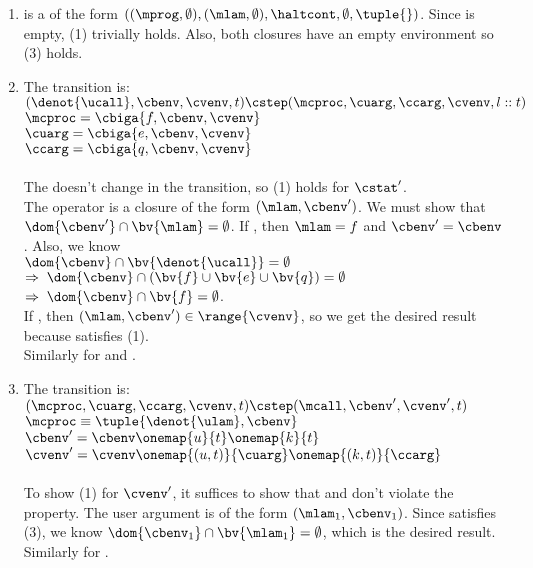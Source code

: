 \documentclass{LMCS}
\theoremstyle{definition} \newtheorem{property}[thm]{Property}
\begin{document}
\begin{enumerate}[$\bullet$]
\item 
  \initstate{} is a \duapply{} of the form
  $((\mprog,\emptyset), (\mlam, \emptyset), \haltcont, \emptyset, \tuple{})$.
  Since \cvenv{} is empty, (1) trivially holds.
  Also, both closures have an empty environment so (3) holds.
\item
  The  transition is: \\
  $(\denot{\ucall}, \cbenv, \cvenv, t) \cstep 
  (\mcproc, \cuarg, \ccarg, \cvenv, l::t)$ \\
  $\mcproc = \cbiga{f, \cbenv, \cvenv}$ \\
  $\cuarg = \cbiga{e, \cbenv, \cvenv}$ \\
  $\ccarg = \cbiga{q, \cbenv, \cvenv}$ 
  \\ \\
  The \cvenv{} doesn't change in the transition, so (1) holds for $\cstat'$.\\
  The operator is a closure of the form $(\mlam, \cbenv')$.
  We must show that $\dom{\cbenv'} \cap \bv{\mlam} = \emptyset$.
  If , then $\mlam = f$ and $\cbenv' = \cbenv$.
  Also, we know \\
  $\dom{\cbenv} \cap \bv{\denot{\ucall}} = \emptyset$ \\
  $\Rightarrow\; \dom{\cbenv} \cap (\bv{f}\cup\bv{e}\cup\bv{q}) = \emptyset$ \\
  $\Rightarrow\; \dom{\cbenv} \cap \bv{f} = \emptyset$. \\
  If , then $(\mlam, \cbenv') \in \range{\cvenv}$, so we get the 
  desired result because \cvenv{} satisfies (1). \\
  Similarly for \cuarg{} and \ccarg.
\item
  The  transition is: \\
  $(\mcproc, \cuarg, \ccarg, \cvenv, t) \cstep (\mcall, \cbenv', \cvenv', t)$ \\
  $\mcproc \equiv \tuple{\denot{\ulam}, \cbenv}$ \\
  $\cbenv' = \cbenv \onemap{u}{t} \onemap{k}{t}$ \\
  $\cvenv' = \cvenv \onemap{(u, t)}{\cuarg} \onemap{(k, t)}{\ccarg}$ 
  \\ \\
  To show (1) for $\cvenv'$, it suffices to show that \cuarg{} and \ccarg{}
  don't violate the property.
  The user argument \cuarg{} is of the form $(\mlam_1, \cbenv_1)$.
  Since \cstat{} satisfies (3), we know $\dom{\cbenv_1} \cap \bv{\mlam_1} =
  \emptyset$, which is the desired result.
  Similarly for \ccarg.


\end{enumerate}
\end{document}
